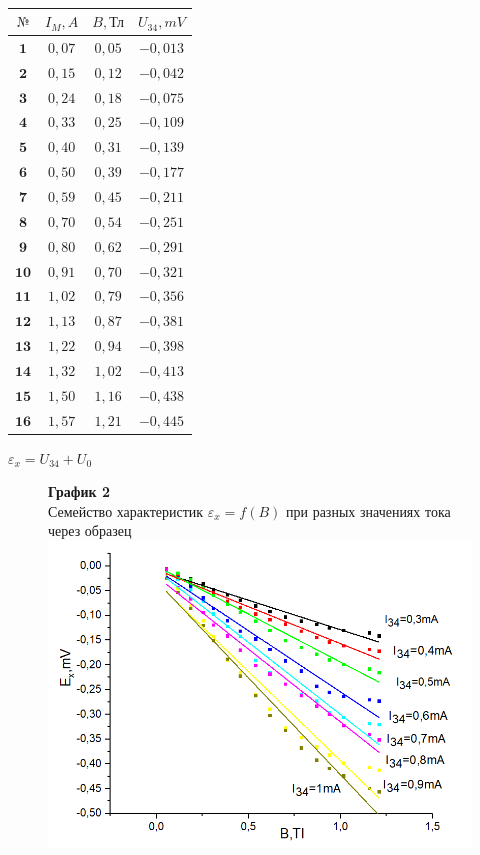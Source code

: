 \documentclass[11pt,a4paper]{article}
\begin{document}
\begin{paracol}{2}
\begin{table}[h!]
\begin{center}
		\\
		\begin{tabular}{|c|c|c|c|} 
			\hline 
			$\text{№}$ & $I_M,A$ & $B,\text{Тл}$ & $U_{34},mV$ \\ \hline 
			$\textbf{1}$ & $0,07$ & $0,05$ & $-0,013$ \\ \hline 
			$\textbf{2}$ & $0,15$ & $0,12$ & $-0,042$ \\ \hline 
			$\textbf{3}$ & $0,24$ & $0,18$ & $-0,075$ \\ \hline 
			$\textbf{4}$ & $0,33$ & $0,25$ & $-0,109$ \\ \hline 
			$\textbf{5}$ & $0,40$ & $0,31$ & $-0,139$ \\ \hline 
			$\textbf{6}$ & $0,50$ & $0,39$ & $-0,177$ \\ \hline 
			$\textbf{7}$ & $0,59$ & $0,45$ & $-0,211$ \\ \hline 
			$\textbf{8}$ & $0,70$ & $0,54$ & $-0,251$ \\ \hline 
			$\textbf{9}$ & $0,80$ & $0,62$ & $-0,291$ \\ \hline 
			$\textbf{10}$ & $0,91$ & $0,70$ & $-0,321$ \\ \hline 
			$\textbf{11}$ & $1,02$ & $0,79$ & $-0,356$ \\ \hline 
			$\textbf{12}$ & $1,13$ & $0,87$ & $-0,381$ \\ \hline 
			$\textbf{13}$ & $1,22$ & $0,94$ & $-0,398$ \\ \hline 
			$\textbf{14}$ & $1,32$ & $1,02$ & $-0,413$ \\ \hline 
			$\textbf{15}$ & $1,50$ & $1,16$ & $-0,438$ \\ \hline 
			$\textbf{16}$ & $1,57$ & $1,21$ & $-0,445$ \\ \hline 
		\end{tabular} 
	\end{center} 
\end{table}
\end{paracol}
$\varepsilon_x = U_{34} + U_0$
\begin{figure}[h!]
	\centering
		\textbf {График 2} \\
	Семейство характеристик $\varepsilon_x = f(B)$ при разных значениях тока через образец\\
	\includegraphics[width=0.8\linewidth]{3}
\end{figure}
\end{document}
